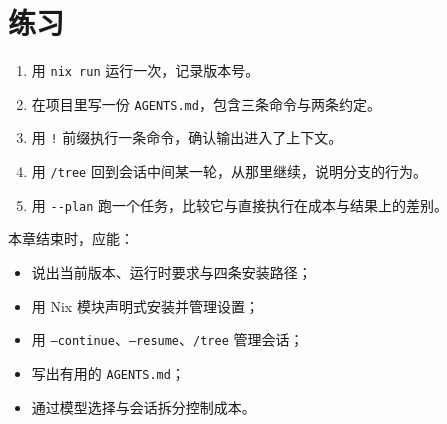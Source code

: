 \section{练习}

\begin{enumerate}
  \item 用 \texttt{nix run} 运行一次，记录版本号。
  \item 在项目里写一份 \texttt{AGENTS.md}，包含三条命令与两条约定。
  \item 用 \texttt{!} 前缀执行一条命令，确认输出进入了上下文。
  \item 用 \texttt{/tree} 回到会话中间某一轮，从那里继续，说明分支的行为。
  \item 用 \texttt{-{}-plan} 跑一个任务，比较它与直接执行在成本与结果上的差别。
\end{enumerate}

\begin{checkpoint}
本章结束时，应能：
\begin{itemize}
  \item 说出当前版本、运行时要求与四条安装路径；
  \item 用 Nix 模块声明式安装并管理设置；
  \item 用 \texttt{--continue}、\texttt{--resume}、\texttt{/tree} 管理会话；
  \item 写出有用的 \texttt{AGENTS.md}；
  \item 通过模型选择与会话拆分控制成本。
\end{itemize}
\end{checkpoint}
